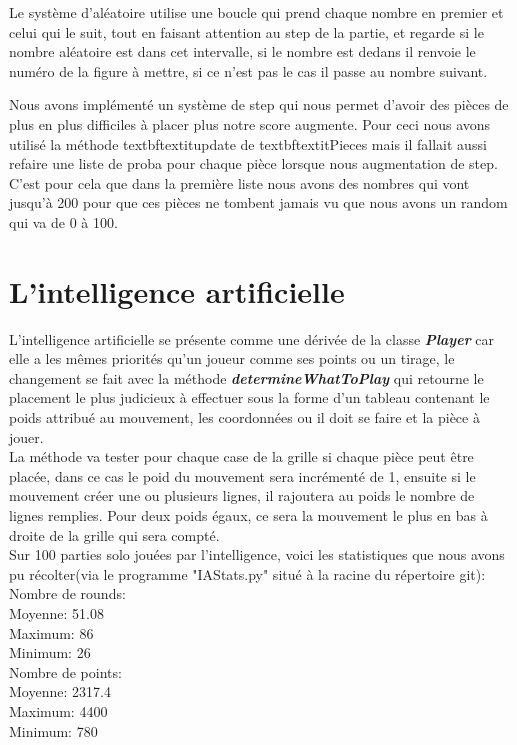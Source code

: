 \documentclass[a4paper]{report}
\begin{document}
Le système d’aléatoire utilise une boucle qui prend chaque nombre en premier et celui qui le suit, tout en faisant attention au step de la partie, et regarde si le nombre aléatoire est dans cet intervalle, si le nombre est dedans il renvoie le numéro de la figure à mettre, si ce n’est pas le cas il passe au nombre suivant.

Nous avons implémenté un système de step qui nous permet d'avoir des pièces de plus en plus difficiles à placer plus notre score augmente. Pour ceci nous avons utilisé la méthode textbf{textit{update}} de textbf{textit{Pieces}} mais il fallait aussi refaire une liste de proba pour chaque pièce lorsque nous augmentation de step. C'est pour cela que dans la première liste nous avons des nombres qui vont jusqu'à 200 pour que ces pièces ne tombent jamais vu que nous avons un random qui va de 0 à 100.

\section{L'intelligence artificielle}
L'intelligence artificielle se présente comme une dérivée de la classe \textbf{\textit{Player}} car elle a les mêmes priorités qu'un joueur comme ses points ou un tirage, le changement se fait avec la méthode \textbf{\textit{determineWhatToPlay}} qui retourne le placement le plus judicieux à effectuer sous la forme d'un tableau contenant le poids attribué au mouvement, les coordonnées ou il doit se faire et la pièce à jouer. \\

La méthode va tester pour chaque case de la grille si chaque pièce peut être placée, dans ce cas le poid du mouvement sera incrémenté de 1, ensuite si le mouvement créer une ou plusieurs lignes, il rajoutera au poids le nombre de lignes remplies. Pour deux poids égaux, ce sera la mouvement le plus en bas à droite de la grille qui sera compté. \\

Sur 100 parties solo jouées par l'intelligence, voici les statistiques que nous avons pu récolter(via le programme "IAStats.py" situé à la racine du répertoire git): \\

Nombre de rounds:\\
Moyenne: 51.08\\
Maximum: 86\\
Minimum: 26\\

Nombre de points:\\
Moyenne: 2317.4\\
Maximum: 4400\\
Minimum: 780\\
\end{document}
